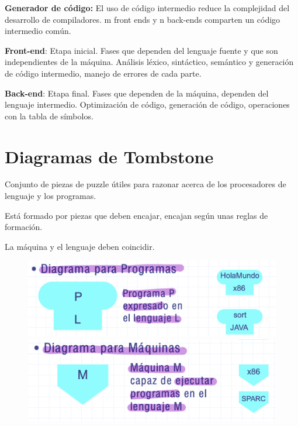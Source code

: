 \documentclass[12pt]{report} %
\begin{document}
\textbf{Generador de código:} El uso de código intermedio reduce la
complejidad del desarrollo de compiladores. m front ends y n back-ends
comparten un código intermedio común.

\textbf{Front-end}: Etapa inicial. Fases que dependen del lenguaje
fuente y que son independientes de la máquina. Análisis léxico,
sintáctico, semántico y generación de código intermedio, manejo de
errores de cada parte.

\textbf{Back-end}: Etapa final. Fases que dependen de la máquina,
dependen del lenguaje intermedio. Optimización de código, generación de
código, operaciones con la tabla de símbolos.


\section{Diagramas de Tombstone}

Conjunto de piezas de puzzle útiles para razonar acerca de los
procesadores de lenguaje y los programas.

Está formado por piezas que deben encajar, encajan según unas reglas de
formación.

La máquina y el lenguaje deben coincidir.

\begin{figure}[H]
	{\includegraphics[scale=.17]{Untitled 16.png}
	\includegraphics[scale=.17]{Untitled 17.png}}
\end{figure}
\end{document}
